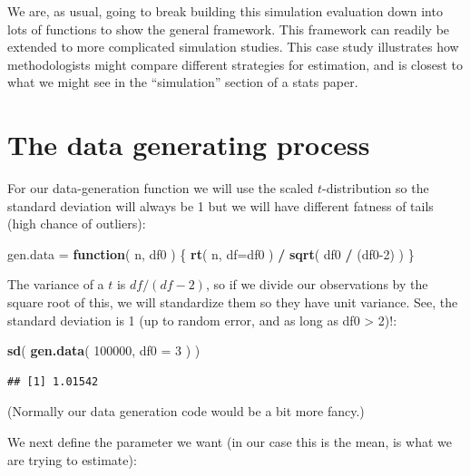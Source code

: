 \documentclass[
]{book}
\newenvironment{Shaded}{\begin{snugshade}}{\end{snugshade}}
\newcommand{\AttributeTok}[1]{\textcolor[rgb]{0.13,0.29,0.53}{#1}}
\newcommand{\ControlFlowTok}[1]{\textcolor[rgb]{0.13,0.29,0.53}{\textbf{#1}}}
\newcommand{\DecValTok}[1]{\textcolor[rgb]{0.00,0.00,0.81}{#1}}
\newcommand{\FunctionTok}[1]{\textcolor[rgb]{0.13,0.29,0.53}{\textbf{#1}}}
\newcommand{\NormalTok}[1]{#1}
\newcommand{\OtherTok}[1]{\textcolor[rgb]{0.56,0.35,0.01}{#1}}
\newcommand{\SpecialCharTok}[1]{\textcolor[rgb]{0.81,0.36,0.00}{\textbf{#1}}}
\begin{document}
We are, as usual, going to break building this simulation evaluation down into lots of
functions to show the general framework. This framework can readily be
extended to more complicated simulation studies.
This case study illustrates how methodologists might compare different strategies for estimation, and is
closest to what we might see in the ``simulation'' section of a stats paper.

\section{The data generating process}\label{the-data-generating-process-1}

For our data-generation function we will use the scaled \(t\)-distribution so
the standard deviation will always be 1 but we will have different fatness of
tails (high chance of outliers):

\begin{Shaded}
\begin{Highlighting}[]
\NormalTok{gen.data }\OtherTok{=} \ControlFlowTok{function}\NormalTok{( n, df0 ) \{}
    \FunctionTok{rt}\NormalTok{( n, }\AttributeTok{df=}\NormalTok{df0 ) }\SpecialCharTok{/} \FunctionTok{sqrt}\NormalTok{( df0 }\SpecialCharTok{/}\NormalTok{ (df0}\DecValTok{{-}2}\NormalTok{) )}
\NormalTok{\}}
\end{Highlighting}
\end{Shaded}

The variance of a \(t\) is \(df/(df-2)\), so if we divide our observations by the
square root of this, we will standardize them so they have unit variance.
See, the standard deviation is 1 (up to random error, and as long as df0 \textgreater{}
2)!:

\begin{Shaded}
\begin{Highlighting}[]
\FunctionTok{sd}\NormalTok{( }\FunctionTok{gen.data}\NormalTok{( }\DecValTok{100000}\NormalTok{, }\AttributeTok{df0 =} \DecValTok{3}\NormalTok{ ) )}
\end{Highlighting}
\end{Shaded}

\begin{verbatim}
## [1] 1.01542
\end{verbatim}

(Normally our data generation code would be a bit more fancy.)

We next define the parameter we want (in our case this is the mean, is what
we are trying to estimate):
\end{document}

